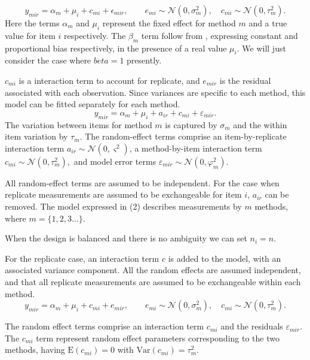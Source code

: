 \documentclass[12pt, a4paper]{report}
\theoremstyle{plain}
\theoremstyle{definition}
\theoremstyle{remark}
\begin{document}
	
	\begin{equation}
	y_{mir}  = \alpha_{m} + \mu_{i} + c_{mi} + \epsilon_{mir}, \qquad  e_{mi}
	\sim \mathcal{N}(0,\sigma^{2}_{m}), \quad c_{mi} \sim \mathcal{N}(0,\tau^{2}_{m}).
	\end{equation}
	Here the terms $\alpha_{m}$ and $\mu_{i}$ represent the fixed effect for method $m$ and a true value for item $i$ respectively. The $\beta_{m}$ term follow from \citet{DunnSEME}, expressing constant and proportional bias respectively, in the presence of a real value $\mu_{i}.$ We will just consider the case where $beta=1$ presently. 
	
	
	
	$c_{mi}$ is a interaction term to account for replicate, and $e_{mir}$ is the residual associated with each observation. Since variances are specific to each method, this model can be fitted separately for each method.
	\begin{equation}\label{BXC-model}
	y_{mir}  = \alpha_{m} + \mu_{i} + a_{ir} + c_{mi} + \varepsilon_{mir}.
	\end{equation}
	The variation between items for method $m$ is captured by $\sigma_m$ and the within item variation by $\tau_m$.	
	The random-effect terms comprise an item-by-replicate interaction term $a_{ir} \sim \mathcal{N}(0,\varsigma^{2})$, a method-by-item interaction term $c_{mi} \sim \mathcal{N}(0,\tau^{2}_{m}),$ and model error terms $\varepsilon_{mir} \sim \mathcal{N}(0,\varphi^{2}_{m}).$ 
	
	All random-effect terms are assumed to be independent. For the case when replicate measurements are assumed to be exchangeable for item $i$, $a_{ir}$ can be removed. The model expressed in (2) describes measurements by $m$ methods, where $m = \{1,2,3\ldots\}$. 
	
	When the design is balanced and there is no ambiguity we can set $n_i=n$.
	
	For the replicate case, an interaction term $c$ is added to the model, with an associated variance component. All the random effects are assumed independent, and that all replicate measurements are assumed to be exchangeable within each method.
	\begin{equation}
	y_{mir}  = \alpha_{m} + \mu_{i} + c_{mi} + e_{mir}, \qquad  e_{mi}
	\sim \mathcal{N}(0,\sigma^{2}_{m}), \quad c_{mi} \sim \mathcal{N}(0,\tau^{2}_{m}).
	\end{equation}
	
	
	The random effect terms comprise an interaction term $c_{mi}$ and the residuals $\varepsilon_{mir}$. The $c_{mi}$ term represent random effect parameters corresponding to the two methods, having $\mathrm{E}(c_{mi})= 0$ with $\mathrm{Var}(c_{mi})=\tau^2_m$.  
	
\end{document}
